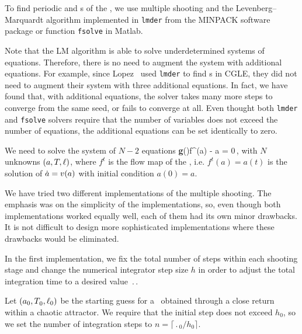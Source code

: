 

To find periodic and \rpo s of the \KSe , we use multiple shooting and
the Levenberg--Marquardt algorithm implemented in {\tt lmder} from
the MINPACK software package or function {\tt fsolve} in Matlab.

Note that the LM algorithm is able to solve underdetermined systems of
equations.  Therefore, there is no need to augment the system with
additional equations.  For example, since Lopez \etal\ used
{\tt lmder} to find \rpo s in CGLE, they did not need to augment
their system with three additional equations.  In fact, we have found
that, with additional equations, the solver takes many more steps to
converge from the same seed, or fails to converge at all.
Even thought both {\tt lmder} and {\tt fsolve} solvers
require that the number of variables does not exceed the number
of equations, the additional equations can be set identically to
zero. 

We need to solve the system of $N-2$ equations
\beq
  {\bf g}(\shift)f^\period{}(a) - a = 0\,,
 with $N$ unknowns $(a, {T_{}}, \ell)$, where
$f^t$ is the flow map of the \KSe , i.e. $f^t(a) = a(t)$ is the
solution of $\dot{a} = v(a)$ with initial condition $a(0) =
a$.

We have tried two different implementations of the multiple shooting.
The emphasis was on the simplicity of the implementations, so, even
though both implementations worked equally well, each of them had
its own minor drawbacks.  It is not difficult to design more
sophisticated implementations where these drawbacks would be
eliminated.

In the first implementation, we fix the total number of steps within
each shooting stage and change the numerical integrator step size
$h$ in order to adjust the total integration time to a desired value
$\period{}$.

Let $(a_0, {T_{}}_0, \ell_0)$ be the starting guess for a \rpo\
obtained through a close return within a chaotic attractor.  We
require that the initial step does not exceed $h_0$, so we set the
number of integration steps to $n = \lceil \period{}_0/h_0\rceil$.

